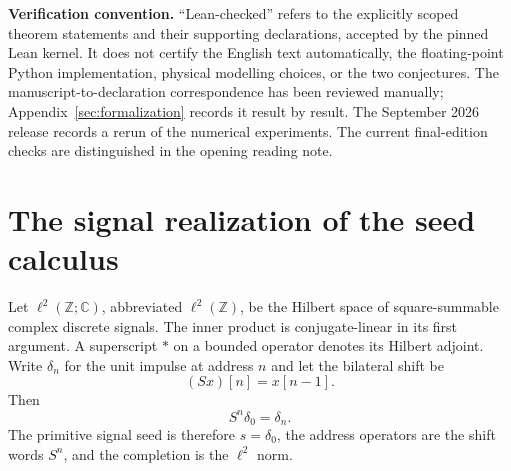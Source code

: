 \documentclass[11pt]{article}
\theoremstyle{definition}
\theoremstyle{remark}
\newcommand{\bbC}{\mathbb C}
\newcommand{\bbZ}{\mathbb Z}
\begin{document}
\begin{center}
\end{center}

\clearpage
\noindent\textbf{Verification convention.} ``Lean-checked'' refers to the explicitly scoped theorem statements and their supporting declarations, accepted by the pinned Lean kernel. It does not certify the English text automatically, the floating-point Python implementation, physical modelling choices, or the two conjectures. The manuscript-to-declaration correspondence has been reviewed manually; Appendix~\ref{sec:formalization} records it result by result. The September 2026 release records a rerun of the numerical experiments. The current final-edition checks are distinguished in the opening reading note.

\tableofcontents
\listoffigures
\listoftables
\clearpage

\section{The signal realization of the seed calculus}

Let $\ell^2(\bbZ;\bbC)$, abbreviated $\ell^2(\bbZ)$, be the Hilbert space of square-summable complex discrete signals. The inner product is conjugate-linear in its first argument. A superscript $*$ on a bounded operator denotes its Hilbert adjoint. Write $\delta_n$ for the unit impulse at address $n$ and let the bilateral shift be
\[
(Sx)[n]=x[n-1].
\]
Then
\[
S^n\delta_0=\delta_n.
\]
The primitive signal seed is therefore $s=\delta_0$, the address operators are the shift words $S^n$, and the completion is the $\ell^2$ norm.
\end{document}
